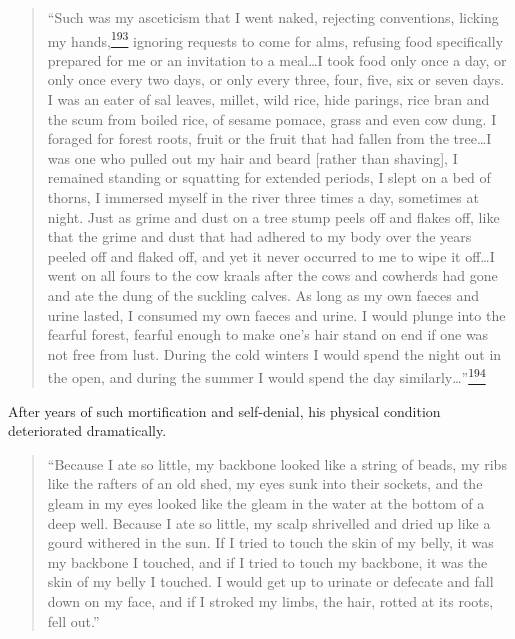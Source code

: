 \begin{quote}
``Such was my asceticism that I went naked, rejecting conventions,
licking my
hands,\label{footprints_split_009.html_fnref193}\hyperref[footprints_split_024.htmlux5cux23fn193]{\textsuperscript{193}}
ignoring requests to come for alms, refusing food specifically prepared
for me or an invitation to a meal\ldots I took food only once a day, or
only once every two days, or only every three, four, five, six or seven
days. I was an eater of sal leaves, millet, wild rice, hide parings,
rice bran and the scum from boiled rice, of sesame pomace, grass and
even cow dung. I foraged for forest roots, fruit or the fruit that had
fallen from the tree\ldots I was one who pulled out my hair and beard
{[}rather than shaving{]}, I remained standing or squatting for extended
periods, I slept on a bed of thorns, I immersed myself in the river
three times a day, sometimes at night. Just as grime and dust on a tree
stump peels off and flakes off, like that the grime and dust that had
adhered to my body over the years peeled off and flaked off, and yet it
never occurred to me to wipe it off\ldots I went on all fours to the cow
kraals after the cows and cowherds had gone and ate the dung of the
suckling calves. As long as my own faeces and urine lasted, I consumed
my own faeces and urine. I would plunge into the fearful forest, fearful
enough to make one's hair stand on end if one was not free from lust.
During the cold winters I would spend the night out in the open, and
during the summer I would spend the day
similarly\ldots''\label{footprints_split_009.html_fnref194}\hyperref[footprints_split_024.htmlux5cux23fn194]{\textsuperscript{194}}
\end{quote}

After years of such mortification and self-denial, his physical
condition deteriorated dramatically.

\begin{quote}
``Because I ate so little, my backbone looked like a string of beads, my
ribs like the rafters of an old shed, my eyes sunk into their sockets,
and the gleam in my eyes looked like the gleam in the water at the
bottom of a deep well. Because I ate so little, my scalp shrivelled and
dried up like a gourd withered in the sun. If I tried to touch the skin
of my belly, it was my backbone I touched, and if I tried to touch my
backbone, it was the skin of my belly I touched. I would get up to
urinate or defecate and fall down on my face, and if I stroked my limbs,
the hair, rotted at its roots, fell out.''
\end{quote}

